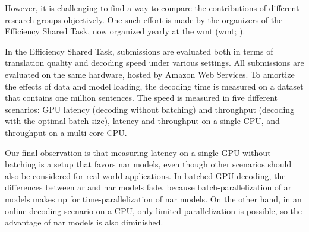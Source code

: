 However, it is challenging to find a way to compare the contributions of
different research groups objectively. One such effort is made by the
organizers of the Efficiency Shared Task, now organized yearly at the \acl{wmt}
(\acs{wmt}; \citealp{heafield-etal-2020-findings,
  heafield-etal-2021-findings}).

In the Efficiency Shared Task, submissions are evaluated both in terms of
translation quality and decoding speed under various settings. All submissions
are evaluated on the same hardware, hosted by Amazon Web Services.  To amortize
the effects of data and model loading, the decoding time is measured on a
dataset that contains one million sentences. The speed is measured in five
different scenarios: GPU latency (decoding without batching) and throughput
(decoding with the optimal batch size), latency and throughput on a single CPU,
and throughput on a multi-core CPU. 

Our final observation is that measuring latency on a single GPU without
batching is a setup that favors \ac{nar} models, even though other scenarios
should also be considered for real-world applications. In batched GPU decoding,
the differences between \ac{ar} and \ac{nar} models fade, because
batch-parallelization of \ac{ar} models makes up for time-parallelization of
\ac{nar} models. On the other hand, in an online decoding scenario on a CPU,
only limited parallelization is possible, so the advantage of \ac{nar} models
is also diminished. 


